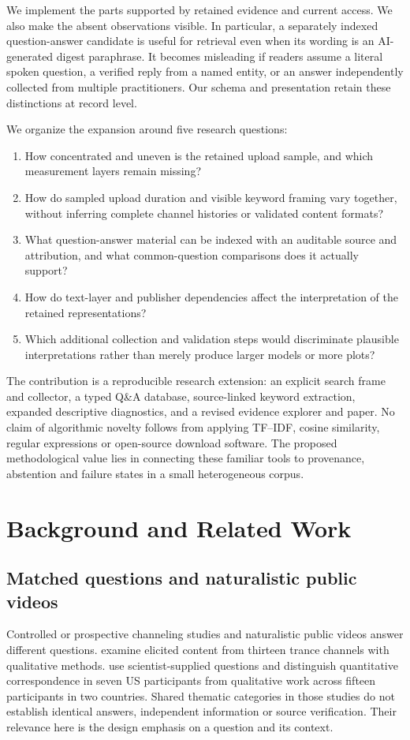 We implement the parts supported by retained evidence and current access. We also make the absent observations visible. In particular, a separately indexed question-answer candidate is useful for retrieval even when its wording is an AI-generated digest paraphrase. It becomes misleading if readers assume a literal spoken question, a verified reply from a named entity, or an answer independently collected from multiple practitioners. Our schema and presentation retain these distinctions at record level.

We organize the expansion around five research questions:
\begin{enumerate}[label=\textbf{RQ\arabic*:}]
\item How concentrated and uneven is the retained upload sample, and which measurement layers remain missing?
\item How do sampled upload duration and visible keyword framing vary together, without inferring complete channel histories or validated content formats?
\item What question-answer material can be indexed with an auditable source and attribution, and what common-question comparisons does it actually support?
\item How do text-layer and publisher dependencies affect the interpretation of the retained representations?
\item Which additional collection and validation steps would discriminate plausible interpretations rather than merely produce larger models or more plots?
\end{enumerate}

The contribution is a reproducible research extension: an explicit search frame and collector, a typed Q\&A database, source-linked keyword extraction, expanded descriptive diagnostics, and a revised evidence explorer and paper. No claim of algorithmic novelty follows from applying TF--IDF, cosine similarity, regular expressions or open-source download software. The proposed methodological value lies in connecting these familiar tools to provenance, abstention and failure states in a small heterogeneous corpus.

\section{Background and Related Work}
\subsection{Matched questions and naturalistic public videos}
Controlled or prospective channeling studies and naturalistic public videos answer different questions. \citet{anastasia2020qualitative} examine elicited content from thirteen trance channels with qualitative methods. \citet{wahbeh2023answers} use scientist-supplied questions and distinguish quantitative correspondence in seven US participants from qualitative work across fifteen participants in two countries. Shared thematic categories in those studies do not establish identical answers, independent information or source verification. Their relevance here is the design emphasis on a question and its context.

